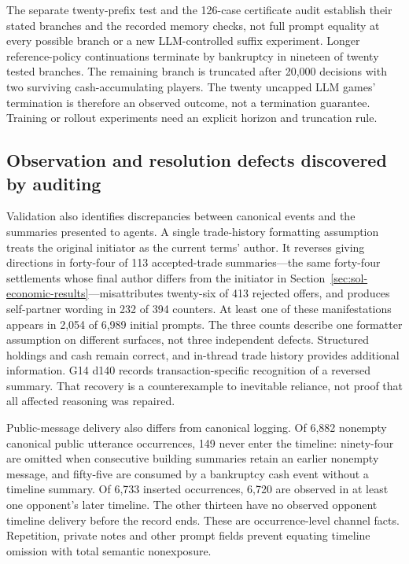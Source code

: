 The separate twenty-prefix test and the 126-case certificate audit establish their stated branches and the recorded memory checks, not full prompt equality at every possible branch or a new LLM-controlled suffix experiment. Longer reference-policy continuations terminate by bankruptcy in nineteen of twenty tested branches. The remaining branch is truncated after 20,000 decisions with two surviving cash-accumulating players. The twenty uncapped LLM games' termination is therefore an observed outcome, not a termination guarantee. Training or rollout experiments need an explicit horizon and truncation rule.

\subsection{Observation and resolution defects discovered by auditing}

Validation also identifies discrepancies between canonical events and the summaries presented to agents. A single trade-history formatting assumption treats the original initiator as the current terms' author. It reverses giving directions in forty-four of 113 accepted-trade summaries---the same forty-four settlements whose final author differs from the initiator in Section~\ref{sec:sol-economic-results}---misattributes twenty-six of 413 rejected offers, and produces self-partner wording in 232 of 394 counters. At least one of these manifestations appears in 2,054 of 6,989 initial prompts. The three counts describe one formatter assumption on different surfaces, not three independent defects. Structured holdings and cash remain correct, and in-thread trade history provides additional information. G14 d140 records transaction-specific recognition of a reversed summary. That recovery is a counterexample to inevitable reliance, not proof that all affected reasoning was repaired.

Public-message delivery also differs from canonical logging. Of 6,882 nonempty canonical public utterance occurrences, 149 never enter the timeline: ninety-four are omitted when consecutive building summaries retain an earlier nonempty message, and fifty-five are consumed by a bankruptcy cash event without a timeline summary. Of 6,733 inserted occurrences, 6,720 are observed in at least one opponent's later timeline. The other thirteen have no observed opponent timeline delivery before the record ends. These are occurrence-level channel facts. Repetition, private notes and other prompt fields prevent equating timeline omission with total semantic nonexposure.

